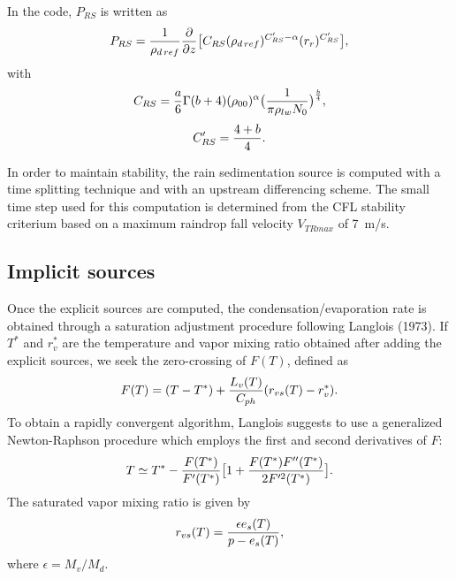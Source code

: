 In the code, $P_{RS}$ is written as
\begin{equation}
P_{RS} = {1 \over \rho_{d\,ref}}{\partial \over \partial z} \big[ C_{RS}
(\rho_{d\,ref})^{C'_{RS}-\alpha} (r_r )^{C'_{RS}}\big],
\end{equation}
with
$$C_{RS}= {a \over 6} \Gamma(b+4)( \rho_{00}) ^\alpha
\big( {1\over \pi \rho_{lw} N_0} \big)^{b \over 4},$$
$$C'_{RS}={4+b \over 4}.$$

In order to maintain stability, the rain sedimentation source is computed with
a time splitting technique and with  an upstream differencing scheme. The small
time step used for this computation is determined from the CFL stability
criterium based on a maximum raindrop fall velocity $V_{TRmax}$ of 7~m/s.

\subsection{Implicit sources}
Once the explicit sources are computed, the condensation/evaporation rate is
obtained through a saturation adjustment procedure following Langlois (1973).
If $T^*$ and $r_v^*$ are the temperature and vapor mixing ratio obtained after
adding the explicit sources, we seek the zero-crossing of $F(T)$, defined as
\begin{equation}
F(T)= (T-T^*) + {L_v(T) \over C_{ph}} (r_{vs}(T)-r_v^*).
\end{equation}
To obtain a rapidly convergent algorithm, Langlois suggests to use a
generalized
Newton-Raphson procedure which employs the first and second derivatives of $F$:
\begin{equation}
T \simeq T^*- {F(T^*) \over F'(T^*)} \big[ 1+ {F(T^*)F''(T^*) \over 2 F'^2(T^*)}\big].
\end{equation}
The saturated vapor mixing ratio is given by
\begin{equation}
r_{vs}(T)= {\epsilon e_s(T) \over p-e_s(T)},
\end{equation}
where $\epsilon = M_v/M_d$.

